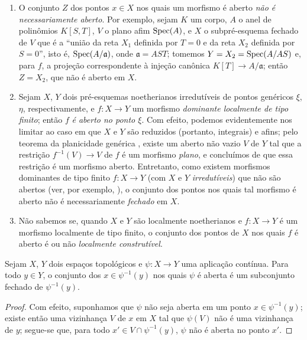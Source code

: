 \begin{remarks}[14.1.3]
\label{IV.14.1.3}
\begin{enumerate}[label=(\roman*)]
  \item O conjunto $Z$ dos pontos $x\in X$ nos quais um morfismo é aberto \emph{não é necessariamente aberto}.
  Por exemplo, sejam $K$ um corpo, $A$ o anel de polinômios $K[S,T]$, $V$ o plano afim $\operatorname{Spec}(A)$, e $X$ o subpré-esquema fechado de $V$ que é a “união da reta $X_1$ definida por $T=0$ e da reta $X_2$ definida por $S=0$”, isto é, $\operatorname{Spec}(A/\mathfrak a)$, onde $\mathfrak a=AST$; tomemos $Y=X_2=\operatorname{Spec}(A/AS)$ e, para $f$, a projeção correspondente à injeção canônica $K[T]\to A/\mathfrak a$; então $Z=X_2$, que não é aberto em $X$.

  \item Sejam $X$, $Y$ dois pré-esquemas noetherianos irredutíveis de pontos genéricos $\xi$, $\eta$, respectivamente, e $f:X\to Y$ um morfismo \emph{dominante localmente de tipo finito}; então $f$ \emph{é aberto no ponto $\xi$}.
  Com efeito, podemos evidentemente nos limitar ao caso em que $X$ e $Y$ são reduzidos (portanto, integrais)  e afins; pelo teorema da planicidade genérica , existe um aberto não vazio $V$ de $Y$ tal que a restrição $f^{-1}(V)\to V$ de $f$ é um morfismo \emph{plano}, e concluímos de  que essa restrição é um morfismo aberto.
  Entretanto, como existem morfismos dominantes de tipo finito $f:X\to Y$ (com $X$ e $Y$ \emph{irredutíveis}) que não são abertos (ver, por exemplo, ), o conjunto dos pontos nos quais tal morfismo é aberto não é necessariamente \emph{fechado} em $X$.

  \item Não sabemos se, quando $X$ e $Y$ são localmente noetherianos e $f:X\to Y$ é um morfismo localmente de tipo finito, o conjunto dos pontos de $X$ nos quais $f$ é aberto é ou não \emph{localmente construtível}.
\end{enumerate}
\end{remarks}

\begin{proposition}[14.1.4]
\label{IV.14.1.4}
Sejam $X$, $Y$ dois espaços topológicos e $\psi:X\to Y$ uma aplicação contínua.
Para todo $y\in Y$, o conjunto dos $x\in\psi^{-1}(y)$ nos quais $\psi$ é aberta é um subconjunto fechado de $\psi^{-1}(y)$.
\end{proposition}

\begin{proof}
Com efeito, suponhamos que $\psi$ não seja aberta em um ponto $x\in\psi^{-1}(y)$; existe então uma vizinhança $V$ de $x$ em $X$ tal que $\psi(V)$ não é uma vizinhança de $y$; segue-se que, para todo $x'\in V\cap\psi^{-1}(y)$, $\psi$ não é aberta no ponto $x'$.
\end{proof}

